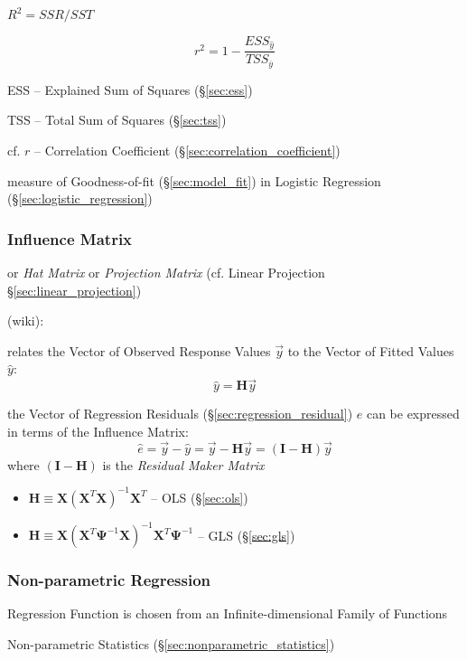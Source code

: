 $R^2 = SSR/SST$

\[
  r^2 = 1 - \frac{
    ESS_{\hat{y}}
  }{
    TSS_{\overline{y}}
  }
\]

ESS -- Explained Sum of Squares (\S\ref{sec:ess})

TSS -- Total Sum of Squares (\S\ref{sec:tss})

cf. $r$ -- Correlation Coefficient (\S\ref{sec:correlation_coefficient})

measure of Goodness-of-fit (\S\ref{sec:model_fit}) in Logistic Regression
(\S\ref{sec:logistic_regression})



\subsubsection{Influence Matrix}\label{sec:influence_matrix}

or \emph{Hat Matrix} or \emph{Projection Matrix} (cf.
Linear Projection \S\ref{sec:linear_projection})

(wiki):

relates the Vector of Observed Response Values $\vec{y}$ to the Vector of Fitted
Values $\hat{y}$:
\[
  \hat{y} = \mathbf{H}\vec{y}
\]

the Vector of Regression Residuals (\S\ref{sec:regression_residual}) $\hat{e}$
can be expressed in terms of the Influence Matrix:
\[
  \hat{e} = \vec{y} - \hat{y} = \vec{y} - \mathbf{H}\vec{y} =
    (\mathbf{I} - \mathbf{H})\vec{y}
\]
where $(\mathbf{I} - \mathbf{H})$ is the \emph{Residual Maker Matrix}

\begin{itemize}
  \item $\mathbf{H} \equiv \mathbf{X}(\mathbf{X}^T\mathbf{X})^{-1}\mathbf{X}^T$
    -- OLS (\S\ref{sec:ols})
  \item $\mathbf{H} \equiv \mathbf{X}
    (\mathbf{X}^T\mathbf{\Psi}^{-1}\mathbf{X})^{-1}
    \mathbf{X}^T\mathbf{\Psi}^{-1}$
    -- GLS (\S\ref{sec:gls})
\end{itemize}



\subsubsection{Non-parametric Regression}\label{sec:nonparametric_regression}

Regression Function is chosen from an Infinite-dimensional Family of Functions

Non-parametric Statistics (\S\ref{sec:nonparametric_statistics})


